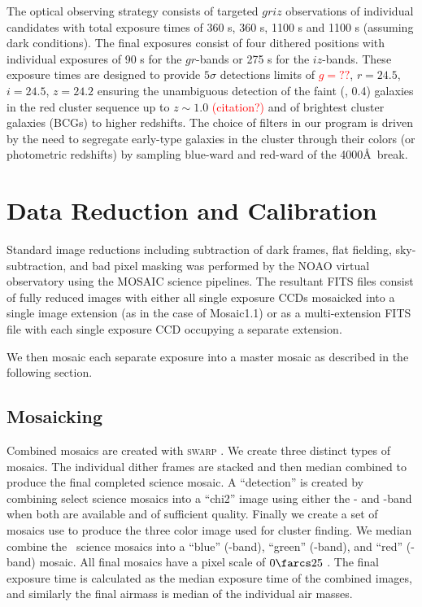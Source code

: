 \documentclass[apj, revtex4-1]{emulateapj}
\newcommand{\editorial}[1]{\textcolor{red}{#1}}
\begin{document}
The optical observing strategy consists of targeted $griz$ observations of individual candidates with total exposure times of 360 s, 360 s, 1100 s and 1100 s (assuming dark conditions). The final exposures consist of four dithered positions with individual exposures of 90 s for the $gr$-bands or 275 s for the $iz$-bands. These exposure times are designed to provide $5\sigma$ detections limits of \editorial{$g=??$}, $r = 24.5$, $i = 24.5$, $z = 24.2$ ensuring the unambiguous detection of the faint (\ie, 0.4\lstar) galaxies in the red cluster sequence up to $z \sim 1.0$ \editorial{(citation?)} and of brightest cluster galaxies (BCGs) to higher redshifts. The choice of filters in our program is driven by the need to segregate early-type galaxies in the cluster through their colors (or photometric redshifts) by sampling blue-ward and red-ward of the 4000\AA\ break.

\section{Data Reduction and Calibration}\label{sec:data reduction}
Standard image reductions including subtraction of dark frames, flat fielding, sky-subtraction, and bad pixel masking was performed by the NOAO virtual observatory using the MOSAIC \citep{Valdes2007} science pipelines. The resultant FITS files consist of fully reduced images with either all single exposure CCDs mosaicked into a single image extension (as in the case of Mosaic1.1) or as a multi-extension FITS file with each single exposure CCD occupying a separate extension.

We then mosaic each separate exposure into a master mosaic as described in the following section.

\subsection{Mosaicking}\label{sec:mosaicks}
Combined mosaics are created with \textsc{swarp} \citep{Bertin2002}. We create three distinct types of mosaics. The individual dither frames are stacked and then median combined to produce the final completed science mosaic. A ``detection'' is created by combining select science mosaics into a ``chi2'' image using either the \sdssi- and \sdssz-band when both are available and of sufficient quality. Finally we create a set of mosaics use to produce the three color image used for cluster finding. We median combine the \sdssg\sdssr\sdssi\sdssz\ science mosaics into a ``blue'' (\sdssg-band), ``green'' (\sdssr-band), and ``red'' (\sdssi\sdssz-band) mosaic. All final mosaics have a pixel scale of $0\farcs25$ \perpixel. The final exposure time is calculated as the median exposure time of the combined images, and similarly the final airmass is median of the individual air masses.
\end{document}
